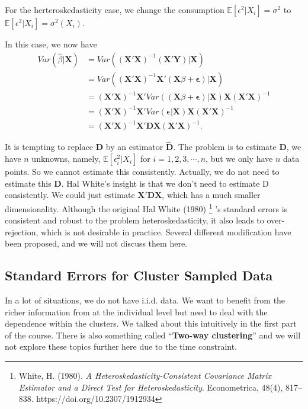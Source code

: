 \documentclass[11pt,a4paper]{amsart}
\theoremstyle{plain}
\theoremstyle{definition}
\begin{document}
	For the herteroskedasticity case, we change the consumption $\mathbb{E}[\epsilon^{2}|X_{i}] = \sigma^{2}$ to $\mathbb{E}[\epsilon^{2}|X_{i}] = \sigma^{2}(X_{i})$.  \par 
	In this case, we now have 
		\[	\begin{aligned}
	Var(\hat{\beta} | \bm{X}) &= Var\left( \left(\bm{X}'\bm{X}\right)^{-1}\left(\bm{X}' \bm{Y}\right) | \bm{X} \right) \\
	&= Var\left( \left(\bm{X}'\bm{X}\right)^{-1} \bm{X}' (\bm{X}\beta + \bm{\epsilon}) | \bm{X} \right) \\
	&=  \left(\bm{X}'\bm{X}\right)^{-1} \bm{X}'  Var\left((\bm{X}\beta + \bm{\epsilon}) | \bm{X} \right) \bm{X} \left(\bm{X}'\bm{X}\right)^{-1} \\
	&= \left(\bm{X}'\bm{X}\right)^{-1} \bm{X}'  Var\left( \bm{\epsilon} | \bm{X} \right) \bm{X} \left(\bm{X}'\bm{X}\right)^{-1} \\
	&=  \left(\bm{X}'\bm{X}\right)^{-1} \bm{X}'  \bm{D} \bm{X} \left(\bm{X}'\bm{X}\right)^{-1}. 
	\end{aligned}	\]
	
	It is tempting to replace $\bm{D}$ by an estimator $\bm{\hat{D}}$. The problem is to estimate $\bm{D}$, we have $n$ unknowns, namely, $\mathbb{E}[\epsilon_{i}^{2} | X_{i}]$ for $i = 1,2,3, \cdots, n$, but we only have $n$ data points. So we cannot estimate this consistently. Actually, we do not need to estimate this $\bm{D}$. Hal White’s insight is that we don’t need to estimate D consistently. We could just estimate $\bm{X}'  \bm{D} \bm{X}$, which has a much smaller dimensionality. Although the original Hal White (1980) \footnote{White, H. (1980). \textit{A Heteroskedasticity-Consistent Covariance Matrix Estimator and a Direct Test for Heteroskedasticity}. Econometrica, 48(4), 817–838. https://doi.org/10.2307/1912934} ’s standard errors is consistent and robust to the problem heteroskedasticity, it also leads to over-rejection, which is not desirable in practice. Several different modification have been proposed, and we will not discuss them here.
	
\subsection{Standard Errors for Cluster Sampled Data}
	In a lot of situations, we do not have i.i.d. data. We want to benefit from the richer information from at the individual level but need to deal with the dependence within the clusters. We talked about this intuitively in the first part of the course. There is also something called ``\textbf{Two-way clustering}'' and we will not explore these topics further here due to the time constraint.
	
\end{document}
